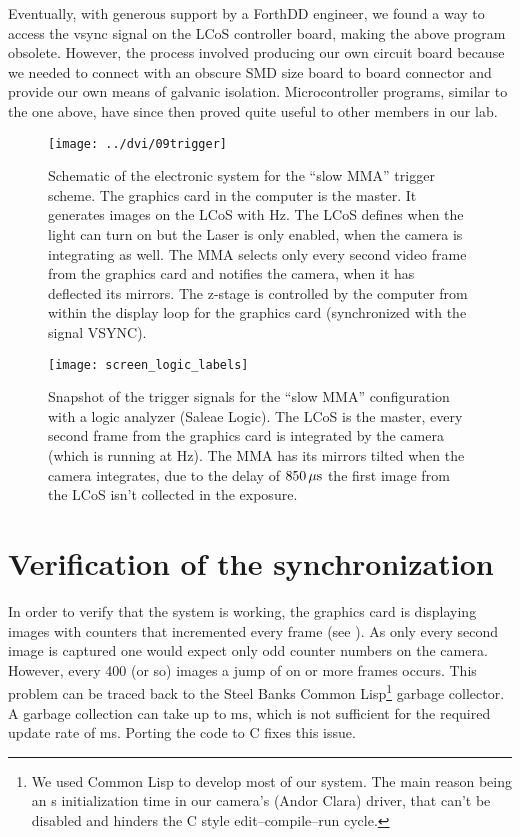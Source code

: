 Eventually, with generous support by a ForthDD engineer, we found a
way to access the vsync signal on the LCoS controller board, making
the above program obsolete. However, the process involved producing
our own circuit board because we needed to connect with an obscure SMD
size board to board connector and provide our own means of galvanic
isolation. Microcontroller programs, similar to the one above, have
since then proved quite useful to other members in our lab. 


\begin{figure}[!hbt]
  \centering
  \texttt{[image: ../dvi/09trigger]}
  \caption{Schematic of the electronic system for the ``slow MMA''
    trigger scheme. The graphics card in the computer is the
    master. It generates images on the LCoS with \unit[60]{Hz}. The
    LCoS defines when the light can turn on but the Laser is only
    enabled, when the camera is integrating as well. The MMA selects
    only every second video frame from the graphics card and notifies
    the camera, when it has deflected its mirrors. The z-stage is controlled by the computer from within the display loop for the graphics card (synchronized with the signal \textsf{VSYNC}).  }
  \label{fig:09trigger}
\end{figure}



\begin{figure}[!hbt]
  \centering
  \texttt{[image: screen\_logic\_labels]}
  \caption{Snapshot of the trigger signals for the ``slow MMA''
    configuration with a logic analyzer (Saleae Logic). The LCoS is
    the master, every second frame from the graphics card is
    integrated by the camera (which is running at \unit[30]{Hz}). The
    MMA has its mirrors tilted when the camera integrates, due to the
    delay of $\unit[850]{\mu s}$ the first image from the LCoS isn't
    collected in the exposure.}
  \label{fig:screen_logic_labels}
\end{figure}

\section{Verification of the synchronization}
In order to verify that the system is working, the graphics card is
displaying images with counters that incremented every frame (see
). As only every second image is
captured one would expect only odd counter numbers on the
camera. However, every 400 (or so) images a jump of on or more frames
occurs. This problem can be traced back to the Steel Banks Common
Lisp\footnote{We used Common Lisp to develop most of our system. The
  main reason being an \unit[8]{s} initialization time in our camera's
  (Andor Clara) driver, that can't be disabled and hinders the C style
  edit--compile--run cycle.} garbage collector. A garbage collection
can take up to \unit[80]{ms}, which is not sufficient for the required
update rate of \unit[16]{ms}. Porting the code to C fixes this issue.

